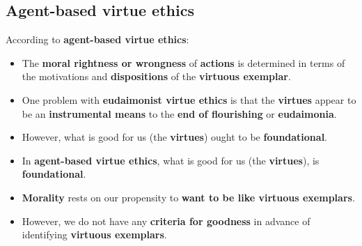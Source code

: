 \documentclass[11pt]{article}
\begin{document}
\subsection{Agent-based virtue ethics}
\label{sec:org86b6de9}
According to \textbf{agent-based virtue ethics}:
\begin{itemize}
\item The \textbf{moral rightness or wrongness} of \textbf{actions} is determined in terms of the motivations and \textbf{dispositions} of the \textbf{virtuous exemplar}.
\item One problem with \textbf{eudaimonist virtue ethics} is that the \textbf{virtues} appear to be an \textbf{instrumental means} to the \textbf{end of flourishing} or \textbf{eudaimonia}.
\item However, what is good for us (the \textbf{virtues}) ought to be \textbf{foundational}.
\item In \textbf{agent-based virtue ethics}, what is good for us (the \textbf{virtues}), is \textbf{foundational}.
\item \textbf{Morality} rests on our propensity to \textbf{want to be like virtuous exemplars}.
\item However, we do not have any \textbf{criteria for goodness} in advance of identifying \textbf{virtuous exemplars}.
\end{itemize}

 \newpage
\end{document}
